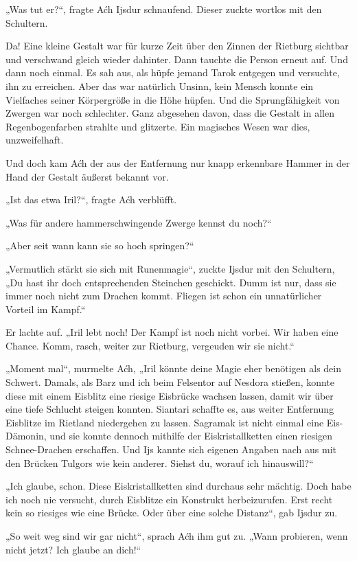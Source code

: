 „Was tut er?“, fragte Aćh Ijsdur schnaufend. Dieser zuckte wortlos mit den Schultern.

Da! Eine kleine Gestalt war für kurze Zeit über den Zinnen der Rietburg sichtbar und verschwand gleich wieder dahinter. Dann tauchte die Person erneut auf. Und dann noch einmal. Es sah aus, als hüpfe jemand Tarok entgegen und versuchte, ihn zu erreichen. Aber das war natürlich Unsinn, kein Mensch konnte ein Vielfaches seiner Körpergröße in die Höhe hüpfen. Und die Sprungfähigkeit von Zwergen war noch schlechter. Ganz abgesehen davon, dass die Gestalt in allen Regenbogenfarben strahlte und glitzerte. Ein magisches Wesen war dies, unzweifelhaft.

Und doch kam Aćh der aus der Entfernung nur knapp erkennbare Hammer in der Hand der Gestalt äußerst bekannt vor.

„Ist das etwa Iril?“, fragte Aćh verblüfft.

„Was für andere hammerschwingende Zwerge kennst du noch?“

„Aber seit wann kann sie so hoch springen?“

„Vermutlich stärkt sie sich mit Runenmagie“, zuckte Ijsdur mit den Schultern, „Du hast ihr doch entsprechenden Steinchen geschickt. Dumm ist nur, dass sie immer noch nicht zum Drachen kommt. Fliegen ist schon ein unnatürlicher Vorteil im Kampf.“

Er lachte auf. „Iril lebt noch! Der Kampf ist noch nicht vorbei. Wir haben eine Chance. Komm, rasch, weiter zur Rietburg, vergeuden wir sie nicht.“

„Moment mal“, murmelte Aćh, „Iril könnte deine Magie eher benötigen als dein Schwert. Damals, als Barz und ich beim Felsentor auf Nesdora stießen, konnte diese mit einem Eisblitz eine riesige Eisbrücke wachsen lassen, damit wir über eine tiefe Schlucht steigen konnten. Siantari schaffte es, aus weiter Entfernung Eisblitze im Rietland niedergehen zu lassen. Sagramak ist nicht einmal eine Eis-Dämonin, und sie konnte dennoch mithilfe der Eiskristallketten einen riesigen Schnee-Drachen erschaffen. Und Ijs kannte sich eigenen Angaben nach aus mit den Brücken Tulgors wie kein anderer. Siehst du, worauf ich hinauswill?“

„Ich glaube, schon. Diese Eiskristallketten sind durchaus sehr mächtig. Doch habe ich noch nie versucht, durch Eisblitze ein Konstrukt herbeizurufen. Erst recht kein so riesiges wie eine Brücke. Oder über eine solche Distanz“, gab Ijsdur zu.

„So weit weg sind wir gar nicht“, sprach Aćh ihm gut zu. „Wann probieren, wenn nicht jetzt? Ich glaube an dich!“

